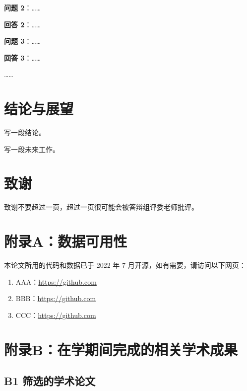 \documentclass[14pt]{jnuthesis}
\begin{document}
\textbf{问题 2}：……

\textbf{回答 2}：……

\textbf{问题 3}：……

\textbf{回答 3}：……

……

\chapter{结论与展望}
\label{chap:5}

写一段结论。

写一段未来工作。

\appendix

\chapter*{致谢}

致谢不要超过一页，超过一页很可能会被答辩组评委老师批评。

\chapter*{附录A：数据可用性}

本论文所用的代码和数据已于 2022 年 7 月开源，如有需要，请访问以下网页：

\begin{enumerate}
	\item AAA：\url{https://github.com}
	\item BBB：\url{https://github.com}
	\item CCC：\url{https://github.com}
\end{enumerate}

\chapter*{附录B：在学期间完成的相关学术成果}

\section*{B1 筛选的学术论文}
\end{document}
